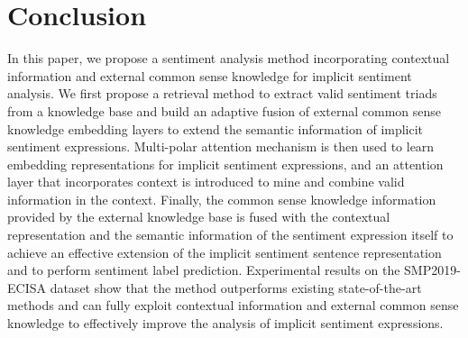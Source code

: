 \section{Conclusion}

In this paper, we propose a sentiment analysis method incorporating contextual information and external common sense knowledge for implicit sentiment analysis.
We first propose a retrieval method to extract valid sentiment triads from a knowledge base and build an adaptive fusion of external common sense knowledge embedding layers to extend the semantic information of implicit sentiment expressions.
Multi-polar attention mechanism is then used to learn embedding representations for implicit sentiment expressions, and an attention layer that incorporates context is introduced to mine and combine valid information in the context.
Finally, the common sense knowledge information provided by the external knowledge base is fused with the contextual representation and the semantic information of the sentiment expression itself to achieve an effective extension of the implicit sentiment sentence representation and to perform sentiment label prediction.
Experimental results on the SMP2019-ECISA dataset show that the method outperforms existing state-of-the-art methods and can fully exploit contextual information and external common sense knowledge to effectively improve the analysis of implicit sentiment expressions.
